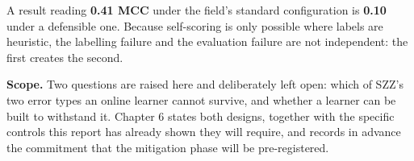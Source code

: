 A result reading \textbf{0.41 MCC} under the field's standard
configuration is \textbf{0.10} under a defensible one. Because
self-scoring is only possible where labels are heuristic, the labelling
failure and the evaluation failure are not independent: the first
creates the second.

\textbf{Scope.} Two questions are raised here and deliberately left
open: which of SZZ's two error types an online learner cannot survive,
and whether a learner can be built to withstand it. Chapter 6 states
both designs, together with the specific controls this report has
already shown they will require, and records in advance the commitment
that the mitigation phase will be pre-registered.
